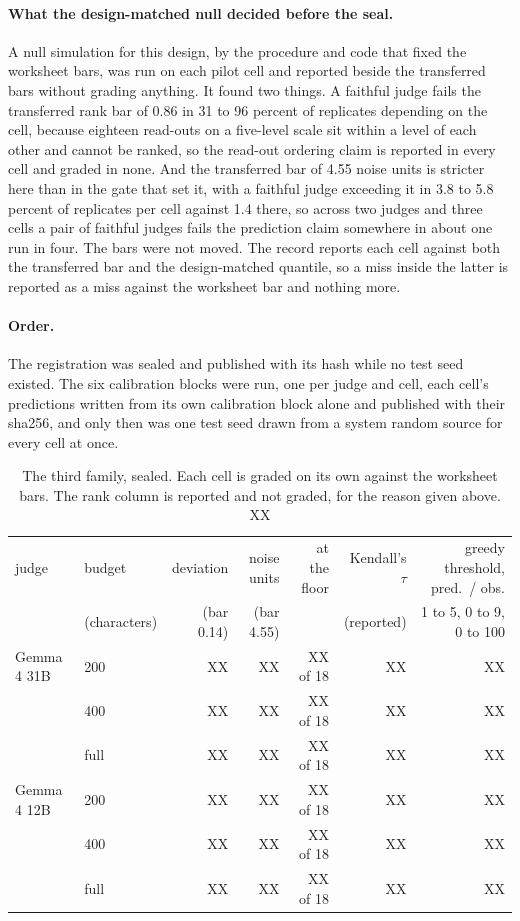 \paragraph{What the design-matched null decided before the seal.}
A null simulation for this design, by the procedure and code that fixed the worksheet bars, was run on each pilot cell and reported beside the transferred bars without grading anything. It found two things. A faithful judge fails the transferred rank bar of 0.86 in 31 to 96 percent of replicates depending on the cell, because eighteen read-outs on a five-level scale sit within a level of each other and cannot be ranked, so the read-out ordering claim is reported in every cell and graded in none. And the transferred bar of 4.55 noise units is stricter here than in the gate that set it, with a faithful judge exceeding it in 3.8 to 5.8 percent of replicates per cell against 1.4 there, so across two judges and three cells a pair of faithful judges fails the prediction claim somewhere in about one run in four. The bars were not moved. The record reports each cell against both the transferred bar and the design-matched quantile, so a miss inside the latter is reported as a miss against the worksheet bar and nothing more.

\paragraph{Order.}
The registration was sealed and published with its hash while no test seed existed. The six calibration blocks were run, one per judge and cell, each cell's predictions written from its own calibration block alone and published with their sha256, and only then was one test seed drawn from a system random source for every cell at once.


\begin{table}[h]
\centering
\small
\caption{The third family, sealed. Each cell is graded on its own against the worksheet bars. The rank column is reported and not graded, for the reason given above. XX}
\label{tab:reviews}
\begin{tabular}{llrrrrr}
\toprule
judge & budget & deviation & noise units & at the floor & Kendall's $\tau$ & greedy threshold, pred.\ / obs. \\
 & (characters) & (bar 0.14) & (bar 4.55) & & (reported) & 1 to 5, 0 to 9, 0 to 100 \\
\midrule
Gemma 4 31B & 200  & XX & XX & XX of 18 & XX & XX \\
            & 400  & XX & XX & XX of 18 & XX & XX \\
            & full & XX & XX & XX of 18 & XX & XX \\
Gemma 4 12B & 200  & XX & XX & XX of 18 & XX & XX \\
            & 400  & XX & XX & XX of 18 & XX & XX \\
            & full & XX & XX & XX of 18 & XX & XX \\
\bottomrule
\end{tabular}
\end{table}

